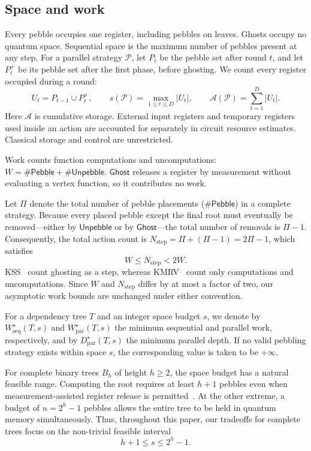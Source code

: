 \documentclass[11pt]{article}
\theoremstyle{definition}
\theoremstyle{remark}
\newcommand{\Peb}{\mathsf{Pebble}}
\newcommand{\Unp}{\mathsf{Unpebble}}
\newcommand{\Ghost}{\mathsf{Ghost}}
\newcommand{\Area}{\mathcal A}
\newcommand{\Wseq}{W_{\mathrm{seq}}}
\newcommand{\Wpar}{W_{\mathrm{par}}}
\newcommand{\Dpar}{D_{\mathrm{par}}}
\begin{document}
\subsection{Space and work}
\label{sec:work-counts}

Every pebble occupies one register, including pebbles on leaves. Ghosts occupy no quantum space. Sequential space is the maximum number of pebbles present at any step. For a parallel strategy $\mathcal P$, let $P_t$ be the pebble set after round $t$, and let $P_t^+$ be its pebble set after the first phase, before ghosting. We count every register occupied during a round:
\begin{equation}
U_t=P_{t-1}\cup P_t^+, \qquad s(\mathcal P)=\max_{1\le t\le D}|U_t|, \qquad \Area(\mathcal P)=\sum_{t=1}^D|U_t|.
\label{eq:parallel-resources}
\end{equation}
Here $\Area$ is cumulative storage. External input registers and temporary registers used inside an action are accounted for separately in circuit resource estimates. Classical storage and control are unrestricted.

Work counts function computations and uncomputations: $W = \#\Peb + \#\Unp$. $\Ghost$ releases a register by measurement without evaluating a vertex function, so it contributes no work.

Let $\Pi$ denote the total number of pebble placements ($\#\Peb$) in a complete strategy. Because every placed pebble except the final root must eventually be removed—either by $\Unp$ or by $\Ghost$—the total number of removals is $\Pi - 1$. Consequently, the total action count is $N_{\text{step}} = \Pi + (\Pi - 1) = 2\Pi - 1$, which satisfies
\begin{equation}
    W \le N_{\text{step}} < 2W.
\end{equation}
KSS~\cite{KSS2025} count ghosting as a step, whereas
KMRV~\cite{KMRV2026} count only computations and uncomputations.
Since $W$ and $N_{\mathrm{step}}$ differ by at most a factor of two,
our asymptotic work bounds are unchanged under either convention.


For a dependency tree $T$ and an integer space budget $s$, we denote by $\Wseq^\star(T,s)$ and $\Wpar^\star(T,s)$ the minimum sequential and parallel work, respectively, and by $\Dpar^\star(T,s)$ the minimum parallel depth. If no valid pebbling strategy exists within space $s$, the corresponding value is taken to be $+\infty$.

For complete binary trees $B_h$ of height $h \ge 2$, the space budget has a natural feasible range. Computing the root requires at least $h+1$ pebbles even when measurement-assisted register release is permitted~\cite{Cook1973,KSS2025}. At the other extreme, a budget of $n = 2^h-1$ pebbles allows the entire tree to be held in quantum memory simultaneously. Thus, throughout this paper, our tradeoffs for complete trees focus on the non-trivial feasible interval
\begin{equation}
    h+1 \le s \le 2^h-1.
\end{equation}
\end{document}
